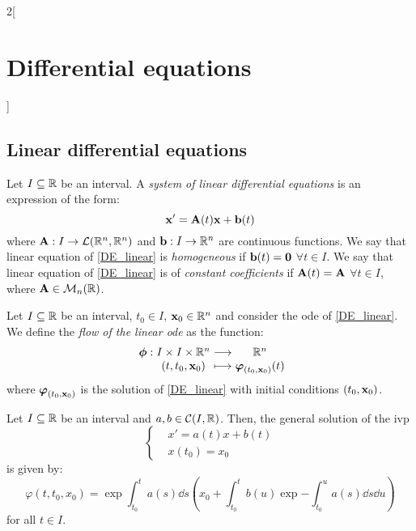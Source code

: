 \documentclass[../../../main.tex]{subfiles}
\begin{document}
\begin{multicols}{2}[\section{Differential equations}]
  \subsection{Linear differential equations}
  \begin{definition}
    Let $I\subseteq\mathbb{R}$ be an interval. A \emph{system of linear differential equations} is an expression of the form:
    \begin{equation}\label{DE_linear}
      \boldsymbol{\mathrm{x}}'=\boldsymbol{\mathrm{A}}(t)\boldsymbol{\mathrm{x}}+\boldsymbol{\mathrm{b}}(t)
    \end{equation}
    where $\boldsymbol{\mathrm{A}}:I\rightarrow\mathcal{L}(\mathbb{R}^n,\mathbb{R}^n)$ and $\boldsymbol{\mathrm{b}}:I\rightarrow\mathbb{R}^n$ are continuous functions.
    We say that linear equation of \cref{DE_linear} is \emph{homogeneous} if $\boldsymbol{\mathrm{b}}(t)=\boldsymbol{\mathrm{0}}$ $\forall t\in I$. We say that linear equation of \cref{DE_linear} is of \emph{constant coefficients} if $\boldsymbol{\mathrm{A}}(t)=\boldsymbol{\mathrm{A}}$ $\forall t\in I$, where $\boldsymbol{\mathrm{A}}\in\mathcal{M}_n(\mathbb{R})$.
  \end{definition}
  \begin{definition}
    Let $I\subseteq\mathbb{R}$ be an interval, $t_0\in I$, $\boldsymbol{\mathrm{x}}_0\in\mathbb{R}^n$ and consider the ode of \cref{DE_linear}. We define the \emph{flow of the linear ode} as the function:
    $$
      \function{\vf{\phi}}{I\times I\times \RR^n}{\RR^n}{(t,t_0,\vf{x}_0)}{\vf{\varphi}_{(t_0,\vf{x}_0)}(t)}
    $$
    where $\boldsymbol{\mathrm{\varphi}}_{(t_0,\boldsymbol{\mathrm{x}}_0)}$ is the solution of \cref{DE_linear} with initial conditions $(t_0,\boldsymbol{\mathrm{x}}_0)$.
  \end{definition}
  \begin{prop}
    Let $I\subseteq\mathbb{R}$ be an interval and $a,b\in\mathcal{C}(I,\mathbb{R})$. Then, the general solution of the ivp
    $$\left\{
      \begin{aligned}
         & x'      =a(t)x+b(t) \\
         & x(t_0)  =x_0
      \end{aligned}
      \right.$$
    is given by:
    \begin{equation}\label{DE_sol-lin}
      \varphi(t,t_0,x_0)=\exp{\int_{t_0}^ta(s)\dd s}\left(x_0+\int_{t_0}^tb(u)\exp{-\int_{t_0}^ua(s)\dd s}\dd u\right)
    \end{equation}
    for all $t\in I$.
  \end{prop}

\end{multicols}
\end{document}
